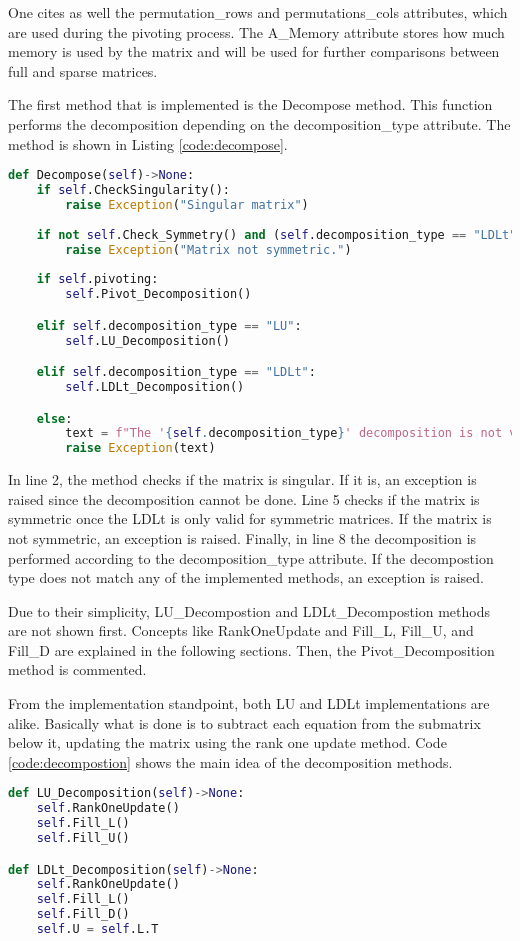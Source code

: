 One cites as well the permutation\_rows and permutations\_cols attributes, which are used during the pivoting process. The A\_Memory attribute stores how much memory is used by the matrix and will be used for further comparisons between full and sparse matrices. 

The first method that is implemented is the Decompose method. This function performs the decomposition depending on the decomposition\_type attribute. The method is shown in Listing \ref{code:decompose}.
\begin{lstlisting}[language=Python, caption={Decompose method.}, label={code:decompose}]
def Decompose(self)->None:
    if self.CheckSingularity():
        raise Exception("Singular matrix")
    
    if not self.Check_Symmetry() and (self.decomposition_type == "LDLt"):
        raise Exception("Matrix not symmetric.")
    
    if self.pivoting:
        self.Pivot_Decomposition()

    elif self.decomposition_type == "LU":
        self.LU_Decomposition()

    elif self.decomposition_type == "LDLt":
        self.LDLt_Decomposition()

    else:
        text = f"The '{self.decomposition_type}' decomposition is not valid. Please choose one of the following: LU, LDLt "
        raise Exception(text)
\end{lstlisting}
In line 2, the method checks if the matrix is singular. If it is, an exception is raised since the decomposition cannot be done. Line 5 checks if the matrix is symmetric once the LDLt is only valid for symmetric matrices. If the matrix is not symmetric, an exception is raised. Finally, in line 8 the decomposition is performed according to the decomposition\_type attribute. If the decompostion type does not match any of the implemented methods, an exception is raised.

Due to their simplicity, LU\_Decompostion and LDLt\_Decompostion methods are not shown first. Concepts like RankOneUpdate and Fill\_L, Fill\_U, and Fill\_D are explained in the following sections. Then, the Pivot\_Decomposition method is commented. 

From the implementation standpoint, both LU and LDLt implementations are alike. Basically what is done is to subtract each equation from the submatrix below it, updating the matrix using the rank one update method. Code \ref{code:decompostion} shows the main idea of the decomposition methods.
\begin{lstlisting}[language=Python, caption={Decomposition method.}, label={code:decompostion}]
def LU_Decomposition(self)->None:
    self.RankOneUpdate()
    self.Fill_L()
    self.Fill_U()

def LDLt_Decomposition(self)->None:
    self.RankOneUpdate()
    self.Fill_L()
    self.Fill_D()
    self.U = self.L.T
\end{lstlisting}

